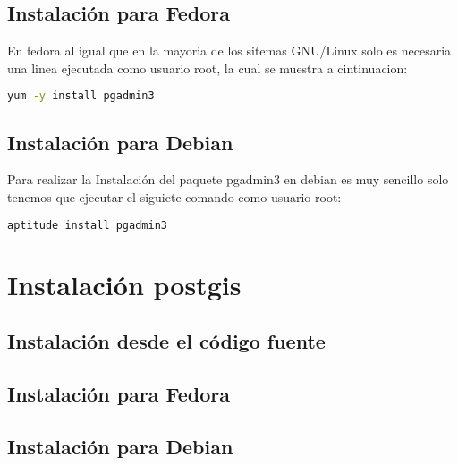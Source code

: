 \documentclass{article}
\begin{document}
\subsection{Instalación para Fedora}
En fedora al igual que en la mayoria de los sitemas GNU/Linux solo es necesaria una linea ejecutada como usuario root,  la cual se muestra a cintinuacion:
\begin{lstlisting}[language=bash, frame=single]
yum -y install pgadmin3
\end{lstlisting}
\subsection{Instalación para Debian}
Para realizar la Instalación del paquete pgadmin3 en debian es muy sencillo solo tenemos que ejecutar el siguiete comando como usuario root:
\begin{lstlisting}[language=bash, frame=single]
aptitude install pgadmin3
\end{lstlisting}
\section{Instalación postgis}
\subsection{Instalación desde el código fuente}
\subsection{Instalación para Fedora}
\lipsum[9]
\subsection{Instalación para Debian}
\lipsum[10]
\end{document}
